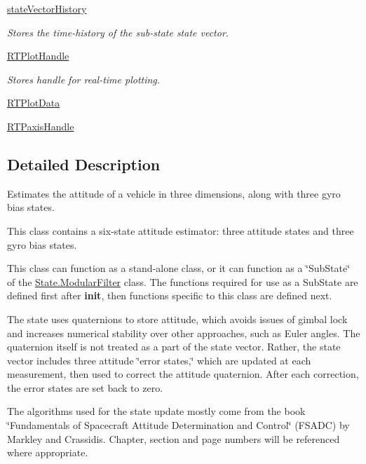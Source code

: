 \begin{DoxyCompactItemize}
\hyperlink{classSubStates_1_1SubState_a24bf2de56fc3037d91cba43d28f3bf60}{state\+Vector\+History}
\begin{DoxyCompactList}\small\item\em Stores the time-\/history of the sub-\/state state vector. \end{DoxyCompactList}\item 
\hyperlink{classSubStates_1_1SubState_ab92a0fafcfd778b8965e3f649ff94fc7}{R\+T\+Plot\+Handle}
\begin{DoxyCompactList}\small\item\em Stores handle for real-\/time plotting. \end{DoxyCompactList}\item 
\hyperlink{classSubStates_1_1SubState_aae3aa07f0d6f54a510db66e0644c958e}{R\+T\+Plot\+Data}
\item 
\hyperlink{classSubStates_1_1SubState_a41c912457be8682326d60f82cc651207}{R\+T\+Paxis\+Handle}
\end{DoxyCompactItemize}


\subsection{Detailed Description}
Estimates the attitude of a vehicle in three dimensions, along with three gyro bias states. 

This class contains a six-\/state attitude estimator\+: three attitude states and three gyro bias states.

This class can function as a stand-\/alone class, or it can function as a \char`\"{}\+Sub\+State\char`\"{} of the \hyperlink{classState_1_1ModularFilter}{State.\+Modular\+Filter} class. The functions required for use as a Sub\+State are defined first after {\bfseries init}, then functions specific to this class are defined next.

The state uses quaternions to store attitude, which avoids issues of gimbal lock and increases numerical stability over other approaches, such as Euler angles. The quaternion itself is not treated as a part of the state vector. Rather, the state vector includes three attitude \char`\"{}error states,\char`\"{} which are updated at each measurement, then used to correct the attitude quaternion. After each correction, the error states are set back to zero.

The algorithms used for the state update mostly come from the book \char`\"{}\+Fundamentals of Spacecraft Attitude Determination and Control\char`\"{} (F\+S\+A\+DC) by Markley and Crassidis. Chapter, section and page numbers will be referenced where appropriate. 


